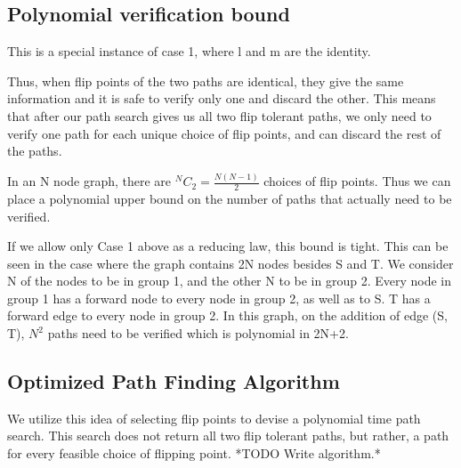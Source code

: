 \documentclass{article}
\begin{document}
\subsection{Polynomial verification bound}
 This is a special instance of case 1, where l and m are the identity.
\begin{center}
\end{center}

Thus, when flip points of the two paths are identical, they give the same information and it is safe to verify only one and discard the other. This means that after our path search gives us all two flip tolerant paths, we only need to verify one path for each unique choice of flip points, and can discard the rest of the paths.

In an N node graph, there are $^NC_2 = \frac{N(N-1)}{2}$ choices of flip points. Thus we can place a polynomial upper bound on the number of paths that actually need to be verified.

If we allow only Case 1 above as a reducing law, this bound is tight. 
This can be seen in the case where the graph contains 2N nodes besides S and T. We consider N of the nodes to be in group 1, and the other N to be in group 2. Every node in group 1 has a forward node to every node in group 2, as well as to S. T has a forward edge to every node in group 2. In this graph, on the addition of edge (S, T), $N^2$ paths need to be verified which is polynomial in 2N+2.

\subsection{Optimized Path Finding Algorithm}
We utilize this idea of selecting flip points to devise a polynomial time path search. This search does not return all two flip tolerant paths, but rather, a path for every feasible choice of flipping point.
 *TODO Write algorithm.*
\end{document}
